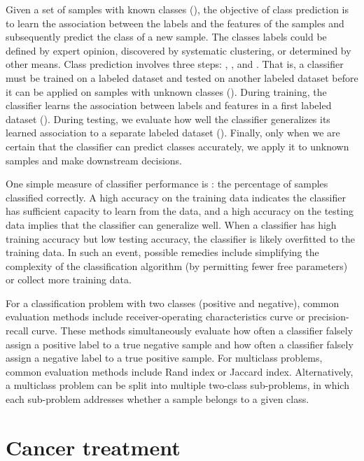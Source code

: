 Given a set of samples with known classes (), the objective of class prediction is to learn the association between the labels and the features of the samples and subsequently predict the class of a new sample. The classes labels could be defined by expert opinion, discovered by systematic clustering, or determined by other means. Class prediction involves three steps: , , and . That is, a classifier must be trained on a labeled dataset and tested on another labeled dataset before it can be applied on samples with unknown classes (). During training, the classifier learns the association between labels and features in a first labeled dataset (). During testing, we evaluate how well the classifier generalizes its learned association to a separate labeled dataset (). Finally, only when we are certain that the classifier can predict classes accurately, we apply it to unknown samples and make downstream decisions.

One simple measure of classifier performance is : the percentage of samples classified correctly. A high accuracy on the training data indicates the classifier has sufficient capacity to learn from the data, and a high accuracy on the testing data implies that the classifier can generalize well. When a classifier has high training accuracy but low testing accuracy, the classifier is likely overfitted to the training data. In such an event, possible remedies include simplifying the complexity of the classification algorithm (by permitting fewer free parameters) or collect more training data.

For a classification problem with two classes (positive and negative), common evaluation methods include receiver-operating characteristics curve or precision-recall curve. These methods simultaneously evaluate how often a classifier falsely assign a positive label to a true negative sample and how often a classifier falsely assign a negative label to a true positive sample. For multiclass problems, common evaluation methods include Rand index or Jaccard index. Alternatively, a multiclass problem can be split into multiple two-class sub-problems, in which each sub-problem addresses whether a sample belongs to a given class.


\section{Cancer treatment}
\label{sec:cancer-treatment}

